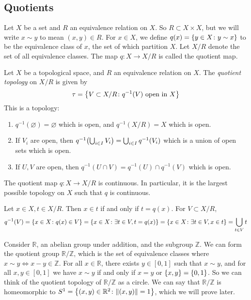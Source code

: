 \subsection{Quotients}
Let \( X \) be a set and \( R \) an equivalence relation on \( X \).
So \( R \subset X \times X \), but we will write \( x \sim y \) to mean \( (x,y) \in R \).
For \( x \in X \), we define \( q(x) = \qty{y \in X \colon y \sim x} \) to be the equivalence class of \( x \), the set of which partition \( X \).
Let \( X / R \) denote the set of all equivalence classes.
The map \( q \colon X \to X/R \) is called the quotient map.
\begin{definition}
	Let \( X \) be a topological space, and \( R \) an equivalence relation on \( X \).
	The \textit{quotient topology} on \( X/R \) is given by
	\[
		\tau = \qty{V \subset X/R \colon q^{-1}(V) \text{ open in } X }
	\]
	This is a topology:
	\begin{enumerate}
		\item \( q^{-1}(\varnothing) = \varnothing \) which is open, and \( q^{-1}(X/R) = X \) which is open.
		\item If \( V_i \) are open, then \( q^{-1}\qty(\bigcup_{i \in I} V_i) = \bigcup_{i \in I} q^{-1}(V_i) \) which is a union of open sets which is open.
		\item If \( U, V \) are open, then \( q^{-1}(U \cap V) = q^{-1}(U) \cap q^{-1}(V) \) which is open.
	\end{enumerate}
\end{definition}
\begin{remark}
	The quotient map \( q \colon X \to X/R \) is continuous.
	In particular, it is the largest possible topology on \( X \) such that \( q \) is continuous.

	Let \( x \in X, t \in X/R \).
	Then \( x \in t \) if and only if \( t = q(x) \).
	For \( V \subset X/R \),
	\[
		q^{-1}(V) = \qty{x \in X \colon q(x) \in V} = \qty{x \in X \colon \exists t \in V, t = q(x)} = \qty{x \in X \colon \exists t \in V, x \in t} = \bigcup_{t \in V} t
	\]
\end{remark}
\begin{example}
	Consider \( \mathbb R \), an abelian group under addition, and the subgroup \( \mathbb Z \).
	We can form the quotient group \( \mathbb R / \mathbb Z \), which is the set of equivalence classes where \( x \sim y \iff x - y \in \mathbb Z \).
	For all \( x \in \mathbb R \), there exists \( y \in [0,1] \) such that \( x \sim y \), and for all \( x, y \in [0,1] \) we have \( x \sim y \) if and only if \( x = y \) or \( \qty{x,y} = \qty{0,1} \).
	So we can think of the quotient topology of \( \mathbb R / \mathbb Z \) as a circle.
	We can say that \( \mathbb R / \mathbb Z \) is homeomorphic to \( S^1 = \qty{(x,y) \in \mathbb R^2 \colon \norm{(x,y)} = 1} \), which we will prove later.
\end{example}
